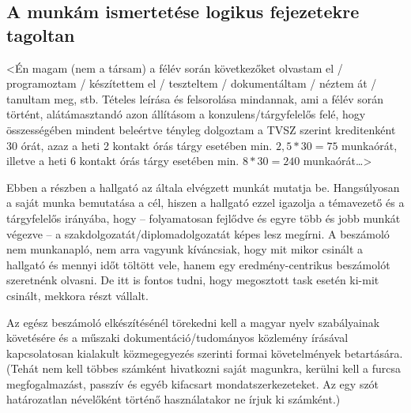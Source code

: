 \documentclass[11pt,a4paper,oneside]{article}
\begin{document}
\subsection{A munkám ismertetése logikus fejezetekre tagoltan}
\label{sec:a-munkam-ismert}
<Én magam (nem a társam) a félév során következőket olvastam el /
programoztam / készítettem el / teszteltem / dokumentáltam / néztem át
/ tanultam meg, stb.  Tételes leírása és felsorolása mindannak, ami a
félév során történt, alátámasztandó azon állításom a
konzulens/tárgyfelelős felé, hogy összességében mindent beleértve
tényleg dolgoztam a TVSZ szerint kreditenként 30 órát, azaz a heti 2
kontakt órás tárgy esetében min. $2,5*30 = 75$ munkaórát, illetve a
heti 6 kontakt órás tárgy esetében min. $8*30 = 240$ munkaórát\dots>

Ebben a részben a hallgató az általa elvégzett munkát mutatja
be. Hangsúlyosan a saját munka bemutatása a cél, hiszen a hallgató
ezzel igazolja a témavezető és a tárgyfelelős irányába, hogy --
folyamatosan fejlődve és egyre több és jobb munkát végezve -- a
szakdolgozatát/diplomadolgozatát képes lesz megírni.  A beszámoló nem
munkanapló, nem arra vagyunk kíváncsiak, hogy mit mikor csinált a
hallgató és mennyi időt töltött vele, hanem egy eredmény-centrikus
beszámolót szeretnénk olvasni.  De itt is fontos tudni, hogy
megosztott task esetén ki-mit csinált, mekkora részt vállalt.

Az egész beszámoló elkészítésénél törekedni kell a magyar nyelv
szabályainak követésére és a műszaki dokumentáció/tudományos közlemény
írásával kapcsolatosan kialakult közmegegyezés szerinti formai
követelmények betartására.  (Tehát nem kell többes számként hivatkozni
saját magunkra, kerülni kell a furcsa megfogalmazást, passzív és egyéb
kifacsart mondatszerkezeteket.  Az egy szót határozatlan névelőként
történő használatakor ne írjuk ki számként.)
\end{document}
